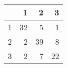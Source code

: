 \begin{tabular}{rrrr}
  \hline
 & 1 & 2 & 3 \\ 
  \hline
1 &  32 &   5 &   1 \\ 
  2 &   2 &  39 &   8 \\ 
  3 &   2 &   7 &  22 \\ 
   \hline
\end{tabular}
